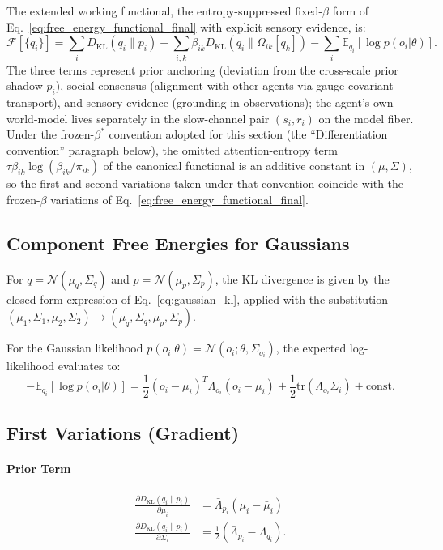 \documentclass[11pt]{article}
\begin{document}
The extended working functional, the entropy-suppressed fixed-$\beta$ form of Eq.~\eqref{eq:free_energy_functional_final} with explicit sensory evidence, is:
\begin{equation}
\mathcal{F}[\{q_i\}] = \sum_i D_{\mathrm{KL}}(q_i \| p_i) + \sum_{i,k} \beta_{ik} D_{\mathrm{KL}}(q_i \| \Omega_{ik}[q_k]) - \sum_i \mathbb{E}_{q_i}[\log p(o_i | \theta)].
\label{eq:extended_free_energy}
\end{equation}
The three terms represent prior anchoring (deviation from the cross-scale prior shadow $p_i$), social consensus (alignment with other agents via gauge-covariant transport), and sensory evidence (grounding in observations); the agent's own world-model lives separately in the slow-channel pair $(s_i, r_i)$ on the model fiber. Under the frozen-$\beta^*$ convention adopted for this section (the ``Differentiation convention'' paragraph below), the omitted attention-entropy term $\tau\beta_{ik}\log(\beta_{ik}/\pi_{ik})$ of the canonical functional is an additive constant in $(\mu, \Sigma)$, so the first and second variations taken under that convention coincide with the frozen-$\beta$ variations of Eq.~\eqref{eq:free_energy_functional_final}.

\subsection{Component Free Energies for Gaussians}

For $q = \mathcal{N}(\mu_q, \Sigma_q)$ and $p = \mathcal{N}(\mu_p, \Sigma_p)$, the KL divergence is given by the closed-form expression of Eq.~\eqref{eq:gaussian_kl}, applied with the substitution $(\mu_1, \Sigma_1, \mu_2, \Sigma_2) \to (\mu_q, \Sigma_q, \mu_p, \Sigma_p)$.

For the Gaussian likelihood $p(o_i | \theta) = \mathcal{N}(o_i; \theta, \Sigma_{o_i})$, the expected log-likelihood evaluates to:
\begin{equation}
-\mathbb{E}_{q_i}[\log p(o_i | \theta)] = \frac{1}{2}(o_i - \mu_i)^T \Lambda_{o_i}(o_i - \mu_i) + \frac{1}{2}\mathrm{tr}(\Lambda_{o_i}\Sigma_i) + \mathrm{const}.
\end{equation}

\subsection{First Variations (Gradient)}

\paragraph{Prior Term}
\begin{align}
\frac{\partial D_{\mathrm{KL}}(q_i \| p_i)}{\partial \mu_i} &= \bar{\Lambda}_{p_i}(\mu_i - \bar{\mu}_i) \\
\frac{\partial D_{\mathrm{KL}}(q_i \| p_i)}{\partial \Sigma_i} &= \frac{1}{2}(\bar{\Lambda}_{p_i} - \Lambda_{q_i}).
\end{align}
\end{document}
